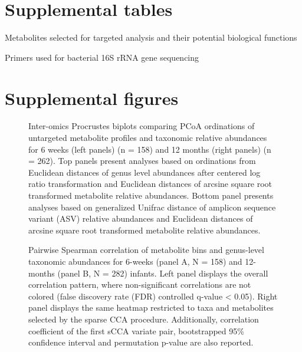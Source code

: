 \section{Supplemental tables}

\begin{table}[]
    \centering
    \caption{Metabolites selected for targeted analysis and their potential biological functions}
    \label{tab:b1}
\end{table}

\begin{table}[]
    \centering
    \caption{Primers used for bacterial 16S rRNA gene sequencing}
    \label{tab:b2}
\end{table}

\section{Supplemental figures}

\begin{figure}[!h]
    \centering
    \caption[Inter-omics Procrustes biplots comparing PCoA ordinations of untargeted metabolite profiles and taxonomic relative abundances for 6 weeks (left panels) (n = 158) and 12 months (right panels) (n = 262).]{Inter-omics Procrustes biplots comparing PCoA ordinations of untargeted metabolite profiles and taxonomic relative abundances for 6 weeks (left panels) (n = 158) and 12 months (right panels) (n = 262). Top panels present analyses based on ordinations from Euclidean distances of genus level abundances after centered log ratio transformation and Euclidean distances of arcsine square root transformed metabolite relative abundances. Bottom panel presents analyses based on generalized Unifrac distance of amplicon sequence variant (ASV) relative abundances and Euclidean distances of arcsine square root transformed metabolite relative abundances.}
    \label{fig:b1}
\end{figure}

\begin{figure}[!h]
    \centering
    \caption[Pairwise Spearman correlation of metabolite bins and genus-level taxonomic abundances for 6-weeks (panel A, N = 158) and 12-months (panel B, N = 282) infants.]{Pairwise Spearman correlation of metabolite bins and genus-level taxonomic abundances for 6-weeks (panel A, N = 158) and 12-months (panel B, N = 282) infants. Left panel displays the overall correlation pattern, where non-significant correlations are not colored (false discovery rate (FDR) controlled q-value < 0.05). Right panel displays the same heatmap restricted to taxa and metabolites selected by the sparse CCA procedure. Additionally, correlation coefficient of the first sCCA variate pair, bootstrapped 95\% confidence interval and permutation p-value are also reported.}
    \label{fig:b2}
\end{figure}


